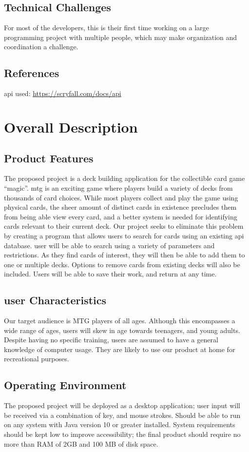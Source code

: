 \documentclass[12pt]{report}
\newcommand{\javaversion}{10 }
\begin{document}
\section{Technical Challenges}
For most of the developers, this is their first time working on a large programming project with multiple people, which may make organization and coordination a challenge.
\section{References}
\acrshort{api} used: \url{https://scryfall.com/docs/api}
\chapter{Overall Description}
\section{Product Features}
The proposed project is a deck building application for the collectible card game “\Gls{magic}”.  \acrshort{mtg} is an exciting game where players build a variety of decks from thousands of card choices. While most players collect and play the game using physical cards, the sheer amount of distinct cards in existence precludes them from being able view every card, and a better system is needed for identifying cards relevant to their current deck. Our project seeks to eliminate this problem by creating a program that allows users to search for cards using an existing \acrshort{api} database. \Gls{user} will be able to search using a variety of parameters and restrictions. As they find cards of interest, they will then be able to add them to one or multiple decks. Options to remove cards from existing decks will also be included. Users will be able to save their work, and return at any time.
\section{\Gls{user} Characteristics}
Our target audience is MTG players of all ages. Although this encompasses a wide range of ages, users will skew in age towards teenagers, and young adults. Despite having no specific training, users are assumed to have a general knowledge of computer usage. They are likely to use our product at home for recreational purposes.
\section{Operating Environment}
The proposed project will be deployed as a desktop application; user input will be received via a combination of key, and mouse strokes. Should be able to run on any system with Java version \javaversion or greater installed. System requirements should be kept low to improve accessibility; the final product should require no more than RAM of 2GB and 100 MB of disk space.
\end{document}
